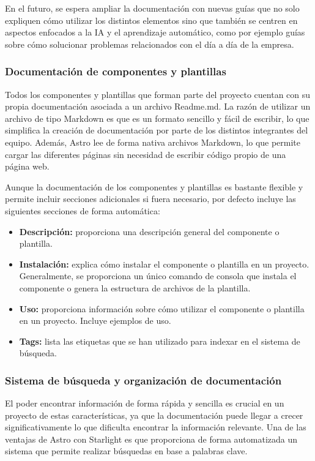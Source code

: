 En el futuro, se espera ampliar la documentación con nuevas guías
que no solo expliquen cómo utilizar los distintos elementos sino que
también se centren en aspectos enfocados a la IA y el aprendizaje
automático, como por ejemplo guías sobre cómo solucionar problemas
relacionados con el día a día de la empresa.

\subsubsection{Documentación de componentes y plantillas}
Todos los componentes y plantillas que forman parte del proyecto
cuentan con su propia documentación asociada a un archivo Readme.md.
La razón de utilizar un archivo de tipo Markdown es que es un formato
sencillo y fácil de escribir, lo que simplifica la creación de documentación
por parte de los distintos integrantes del equipo. Además, Astro
lee de forma nativa archivos Markdown, lo que permite cargar las
diferentes páginas sin necesidad de escribir código propio de una
página web.\medskip

Aunque la documentación de los componentes y plantillas es bastante
flexible y permite incluir secciones adicionales si fuera necesario,
por defecto incluye las siguientes secciones de forma automática:

\begin{itemize}
    \item \textbf{Descripción:} proporciona una descripción general del
    componente o plantilla.
    \item \textbf{Instalación:} explica cómo instalar el componente o plantilla
    en un proyecto. Generalmente, se proporciona un único comando de consola que
    instala el componente o genera la estructura de archivos de la plantilla. 
    \item \textbf{Uso:} proporciona información sobre cómo utilizar el componente
    o plantilla en un proyecto. Incluye ejemplos de uso.
    \item \textbf{Tags:} lista las etiquetas que se han utilizado para indexar en
    el sistema de búsqueda.
\end{itemize}


\subsubsection{Sistema de búsqueda y organización de documentación}
El poder encontrar información de forma rápida y sencilla es crucial
en un proyecto de estas características, ya que la documentación
puede llegar a crecer significativamente lo que dificulta encontrar
la información relevante. Una de las ventajas de Astro con Starlight
es que proporciona de forma automatizada un sistema que permite realizar 
búsquedas en base a palabras clave.\medskip

